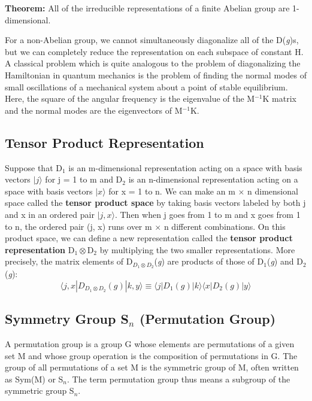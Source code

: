 \textbf{Theorem:} All of the irreducible representations of a finite Abelian group are 1-dimensional.

For a non-Abelian group, we cannot simultaneously diagonalize all of the D(\textit{g})s, 
but we can completely reduce the representation on each subspace of constant H.
A classical problem which is quite analogous to the problem of diagonalizing the Hamiltonian  in quantum mechanics 
is the problem of finding the normal modes of small oscillations of a mechanical system about a point of stable equilibrium. 
Here, the square of the angular frequency is the eigenvalue of the M$^{-1}$K matrix and the normal modes are the eigenvectors of M$^{-1}$K.

\subsection{Tensor Product Representation}
Suppose that D$_1$ is an m-dimensional representation acting on a space with basis vectors $|j\rangle$ for j = 1 to m and 
D$_2$ is an n-dimensional representation acting on a space with basis vectors $|x\rangle$ for x = 1 to n. 
We can make an m $\times$ n dimensional space called the \textbf{tensor product space} by taking basis vectors labeled by both j and x  in an ordered pair $|j, x\rangle$. 
Then when j goes from 1 to m and x goes from 1 to n, the ordered pair (j, x) runs over m $\times$ n different combinations. 
On this product space, we can define a new representation called the \textbf{tensor product representation} D$_1 \otimes$D$_2$ by multiplying the two smaller representations. 
More precisely, the matrix elements of D$_{D_1 \otimes D_2}$(\textit{g}) are products of those of D$_1$(\textit{g}) and D$_2$(\textit{g}):
\begin{equation}
    \langle j, x| D_{D_1 \otimes D_2}(g)|k, y \rangle \equiv \langle j| D_1(g)|k \rangle \langle x|D_2(g)|y \rangle
\end{equation}

\subsection{Symmetry Group \texorpdfstring{S$_n$}. (Permutation Group)}
A permutation group is a group G whose elements are permutations of a given set M and whose group operation is the composition of permutations in G.
The group of all permutations of a set M is the symmetric group of M, often written as Sym(M) or S$_n$. 
The term permutation group thus means a subgroup of the symmetric group S$_n$.

